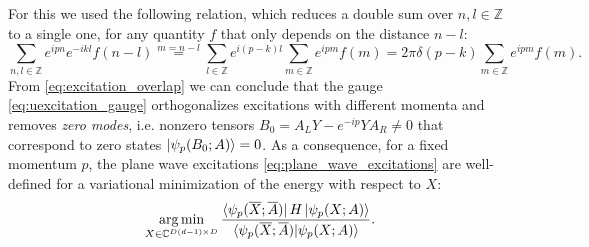 For this we used the following relation, which reduces a double sum over $n, l \in \mathbb{Z}$ to a single one, for any quantity $f$ that only depends on the distance $n - l$:
\begin{equation} \label{eq:double_sum}
	\sum_{n, l \in \mathbb{Z}} e^{ipn} e^{-ikl} f(n-l) \overset{m=n-l}{=} \sum_{l\in \mathbb{Z}} e^{i(p-k)l} \sum_{m \in \mathbb{Z}}e^{ipm} f(m) = 2 \pi \delta (p-k) \sum_{m \in \mathbb{Z}} e^{ipm} f(m).
\end{equation}
From \eqref{eq:excitation_overlap} we can conclude that the gauge \eqref{eq:uexcitation_gauge} orthogonalizes excitations with different momenta and removes \textit{zero modes}, i.e. nonzero tensors $B_0 = A_L Y - e^{-ip} Y A_R \neq 0$ that correspond to zero states $\ket{\psi_p (B_0; A)} = 0$. As a consequence, for a fixed momentum $p$, the plane wave excitations \eqref{eq:plane_wave_excitations} are well-defined for a variational minimization of the energy with respect to $X$:
\begin{equation}
	\operatorname*{arg\,min}_{X \in \mathbb{C}^{D(d-1) \times D}} \frac{\bra{\psi_p(\overline{X}; \overline{A})} H \ket{\psi_p(X; A)}}{\langle \psi_p(\overline{X}; \overline{A}) \vert \psi_p(X; A) \rangle}.
\end{equation}

